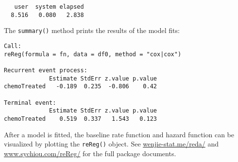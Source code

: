 \begin{Shaded}
\begin{Highlighting}[]
\StringTok{ } \NormalTok{))}
\end{Highlighting}
\end{Shaded}

\begin{verbatim}
   user  system elapsed 
  8.516   0.080   2.838 
\end{verbatim}

The \texttt{summary()} method prints the results of the model fits:

\begin{Shaded}
\begin{Highlighting}[]
\end{Highlighting}
\end{Shaded}

\begin{verbatim}
Call: 
reReg(formula = fn, data = df0, method = "cox|cox")

Recurrent event process:
             Estimate StdErr z.value p.value
chemoTreated   -0.189  0.235  -0.806    0.42

Terminal event:
             Estimate StdErr z.value p.value
chemoTreated    0.519  0.337   1.543   0.123
\end{verbatim}

After a model is fitted, the baseline rate function and hazard function
can be visualized by plotting the \texttt{reReg()} object. See
\url{wenjie-stat.me/reda/} and \url{www.sychiou.com/reReg/} for the full
package documents.
